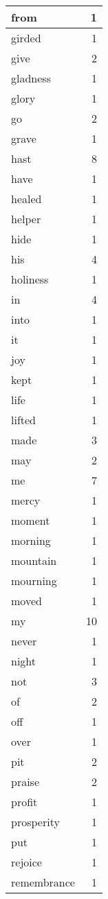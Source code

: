 \begin{center}
\begin{longtable}{l|r}
from & 1 \\ \hline
girded & 1 \\ \hline
give & 2 \\ \hline
gladness & 1 \\ \hline
glory & 1 \\ \hline
go & 2 \\ \hline
grave & 1 \\ \hline
hast & 8 \\ \hline
have & 1 \\ \hline
healed & 1 \\ \hline
helper & 1 \\ \hline
hide & 1 \\ \hline
his & 4 \\ \hline
holiness & 1 \\ \hline
in & 4 \\ \hline
into & 1 \\ \hline
it & 1 \\ \hline
joy & 1 \\ \hline
kept & 1 \\ \hline
life & 1 \\ \hline
lifted & 1 \\ \hline
made & 3 \\ \hline
may & 2 \\ \hline
me & 7 \\ \hline
mercy & 1 \\ \hline
moment & 1 \\ \hline
morning & 1 \\ \hline
mountain & 1 \\ \hline
mourning & 1 \\ \hline
moved & 1 \\ \hline
my & 10 \\ \hline
never & 1 \\ \hline
night & 1 \\ \hline
not & 3 \\ \hline
of & 2 \\ \hline
off & 1 \\ \hline
over & 1 \\ \hline
pit & 2 \\ \hline
praise & 2 \\ \hline
profit & 1 \\ \hline
prosperity & 1 \\ \hline
put & 1 \\ \hline
rejoice & 1 \\ \hline
remembrance & 1 \\ \hline

\end{longtable}
\end{center}
